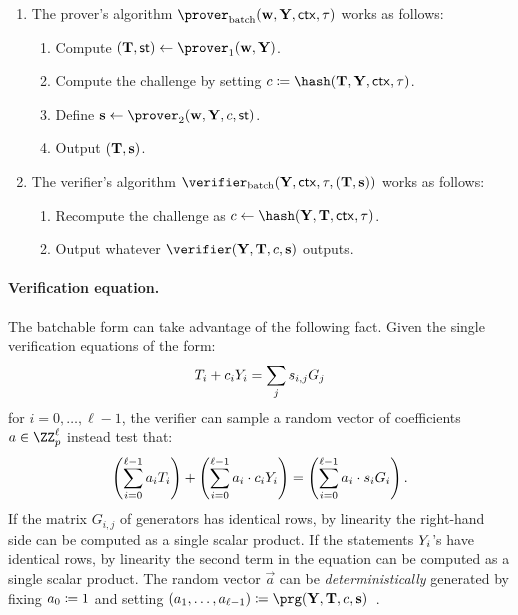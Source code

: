 \documentclass[runningheads,11pt]{article}
\begin{document}
\begin{enumerate}
  \item
    The prover's algorithm $\batchprover(\vec \witness, \vec \statement,\ctx, \stag)$ works as follows:
    \begin{enumerate}
      \item
        Compute $(\vec \commitment,\st)\gets\prover_1(\vec \witness, \vec \statement)$.
      \item
        Compute the challenge by setting $\challenge\defeq\hash(\vec \commitment, \vec \statement,\ctx, \stag)$.
      \item
        Define $\vec \response\gets\prover_2(\vec \witness, \vec \statement,\challenge,\st)$.
      \item
        Output $(\mathbf {T}, \mathbf {s})$.
    \end{enumerate}
  \item
    The verifier's algorithm $\batchverifier(\vec \statement, \ctx, \stag, (\vec \commitment,\vec s))$ works as follows:
    \begin{enumerate}
      \item
        Recompute the challenge as $\challenge\gets\hash(\vec \statement, \vec \commitment, \ctx, \stag)$.
      \item
        Output whatever $\verifier(\vec \statement,\vec \commitment,\challenge,\vec \response)$ outputs.
    \end{enumerate}
\end{enumerate}


\paragraph{Verification equation.}
The batchable form can take advantage of the following fact.
Given the single verification equations of the form:
\[
   T_i + c_i Y_i = \sum_j s_{i, j} G_j
\]
for $i=0, \dots,\ell-1$,
the verifier can sample a random vector of coefficients $a \in \ZZ_p^\ell$ instead test that:
\[
  \left(\sum_{i=0}^{\ell-1} a_i T_i\right) + \left(\sum_{i=0}^{\ell-1} a_i \cdot  c_i Y_i \right) = \left(\sum_{i=0}^{\ell-1} a_i \cdot s_i G_i\right).
\]
If the matrix $G_{i, j}$ of generators has identical rows, by linearity the right-hand side can be computed as a single scalar product.
If the statements $Y_i$'s have identical rows, by linearity the second term in the equation can be computed as a single scalar product.
The random vector $\vec a$ can be \emph{deterministically} generated by fixing $a_0 \coloneqq 1$ and setting $(a_1, \dots, a_{\ell-1}) \defeq \prg(\vec Y, \vec T,  \challenge, \vec s)$~\cite{bip-schnorr}.
\end{document}
